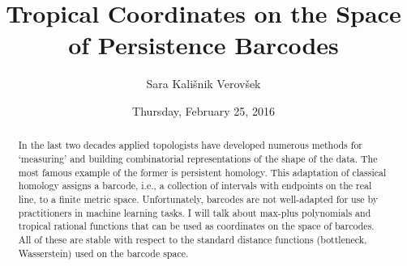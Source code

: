 \documentclass{UAmathtalk}
\author{Sara Kali\v{s}nik Verov\v{s}ek}
\title{Tropical Coordinates on the Space of Persistence Barcodes}
\date{Thursday, February 25, 2016}
\begin{document}
\maketitle

\begin{abstract}
In the last two decades applied topologists have developed numerous methods for `measuring' and building combinatorial representations of the shape of the data. The most famous example of the former is persistent homology. This adaptation of classical homology assigns a barcode, i.e., a collection of intervals with endpoints on the real line, to a finite metric space. Unfortunately, barcodes are not well-adapted for use by practitioners in machine learning tasks. I will talk about max-plus polynomials and tropical rational functions that can be used as coordinates on the space of barcodes. All of these are stable with respect to the standard distance functions (bottleneck, Wasserstein) used on the barcode space.
\end{abstract}
\end{document}
